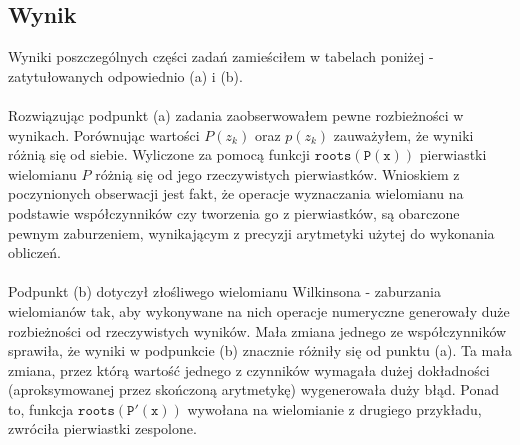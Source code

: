 \subsection{Wynik}
Wyniki poszczególnych części zadań zamieściłem w tabelach poniżej - zatytułowanych odpowiednio (a) i (b). \\\\
Rozwiązując podpunkt (a) zadania zaobserwowałem pewne rozbieżności w wynikach. 
Porównując wartości $ P(z_k) $ oraz $ p(z_k) $ zauważyłem, że wyniki różnią się od siebie. 
Wyliczone za pomocą funkcji $ \mathtt{roots(P(x))} $ pierwiastki wielomianu $ P $ różnią się od jego rzeczywistych pierwiastków. Wnioskiem z poczynionych obserwacji jest fakt, że operacje wyznaczania wielomianu na podstawie współczynników czy tworzenia go z pierwiastków, są obarczone pewnym zaburzeniem, wynikającym z precyzji arytmetyki użytej do wykonania obliczeń. \\\\
Podpunkt (b) dotyczył złośliwego wielomianu Wilkinsona - zaburzania wielomianów tak, aby wykonywane na nich operacje numeryczne generowały duże rozbieżności od rzeczywistych wyników. Mała zmiana jednego ze współczynników sprawiła, że wyniki w podpunkcie (b) znacznie różniły się od punktu (a). Ta mała zmiana, przez którą wartość jednego z czynników wymagała dużej dokładności (aproksymowanej przez skończoną arytmetykę) wygenerowała duży błąd. Ponad to, funkcja $ \mathtt{roots(P'(x))} $ wywołana na wielomianie z drugiego przykładu, zwróciła pierwiastki zespolone.
\newpage
\begin{center}
  
\end{center}